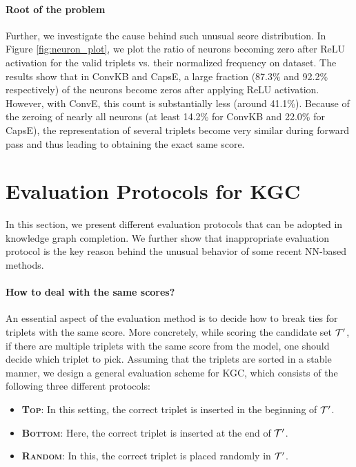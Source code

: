 \documentclass[11pt,a4paper]{article}
\begin{document}
\paragraph{Root of the problem}
Further, we investigate the cause behind such unusual score distribution. In Figure \ref{fig:neuron_plot}, we plot the ratio of neurons becoming zero after ReLU activation for the valid triplets vs. their normalized frequency on \datafb{} dataset. The results show that in ConvKB and CapsE, a large fraction (87.3\% and 92.2\% respectively) of the neurons become zeros after applying ReLU activation. However, with ConvE, this count is substantially less (around 41.1\%). Because of the zeroing of nearly all neurons (at least 14.2\% for ConvKB and 22.0\% for CapsE), the representation of several triplets become very similar during forward pass and thus leading to obtaining the exact same score. 




\section{Evaluation Protocols for KGC}
\label{sec:details}

In this section, we present different evaluation protocols that can be adopted 
in knowledge graph completion. We further show that inappropriate evaluation protocol is the key reason behind the unusual behavior of some recent NN-based methods.

\paragraph{How to deal with the same scores?}
An essential aspect of the evaluation method is to decide how to break ties for triplets with the same score. More concretely, while scoring the candidate set $\mathcal{T}'$, if there are multiple triplets with the same score from the model, one should decide which triplet to pick. Assuming that the triplets are sorted in a stable manner, we design a general evaluation scheme for KGC, which consists of the following three different protocols:

\begin{itemize}
[itemsep=2pt,parsep=1pt,partopsep=1pt,leftmargin=*,topsep=1pt]
	\item \textbf{\textsc{Top}}: In this setting, the correct triplet is inserted in the beginning of $\mathcal{T}'$.
	\item \textbf{\textsc{Bottom}}: Here, the correct triplet is inserted at the end of $\mathcal{T}'$.
	\item \textbf{\textsc{Random}}: In this, the correct triplet is placed randomly in $\mathcal{T}'$.
\end{itemize}
\end{document}
